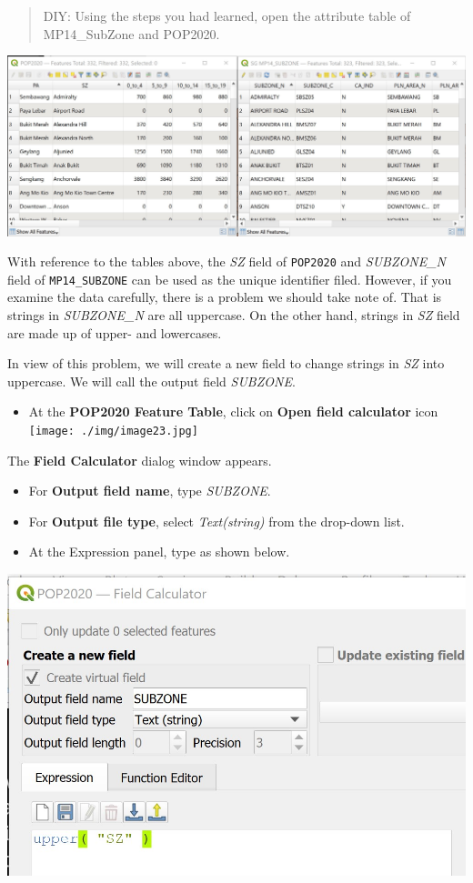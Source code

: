 \documentclass[
  letterpaper,
  DIV=11,
  numbers=noendperiod]{scrreprt}
\providecommand{\tightlist}{%
  \setlength{\itemsep}{0pt}\setlength{\parskip}{0pt}}\usepackage{longtable,booktabs,array}
\begin{document}
\begin{quote}
DIY: Using the steps you had learned, open the attribute table of
MP14\_SubZone and POP2020.
\end{quote}

\includegraphics{./img03/image22.jpg}

With reference to the tables above, the \emph{SZ} field of
\texttt{POP2020} and \emph{SUBZONE\_N} field of \texttt{MP14\_SUBZONE}
can be used as the unique identifier filed. However, if you examine the
data carefully, there is a problem we should take note of. That is
strings in \emph{SUBZONE\_N} are all uppercase. On the other hand,
strings in \emph{SZ} field are made up of upper- and lowercases.

In view of this problem, we will create a new field to change strings in
\emph{SZ} into uppercase. We will call the output field \emph{SUBZONE}.

\begin{itemize}
\tightlist
\item
  At the \textbf{POP2020 Feature Table}, click on \textbf{Open field
  calculator} icon
  \texttt{[image: ./img/image23.jpg]}
\end{itemize}

The \textbf{Field Calculator} dialog window appears.

\begin{itemize}
\tightlist
\item
  For \textbf{Output field name}, type \emph{SUBZONE}.
\item
  For \textbf{Output file type}, select \emph{Text(string)} from the
  drop-down list.
\item
  At the Expression panel, type as shown below.
\end{itemize}

\includegraphics{./img03/image24.jpg}
\end{document}
